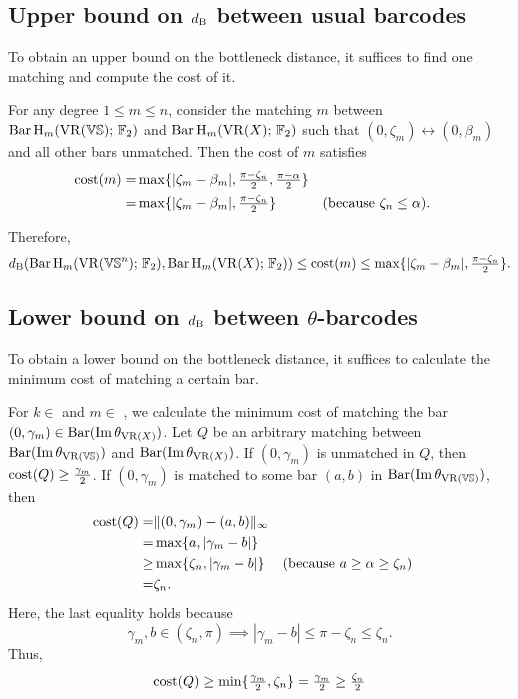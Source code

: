 \subsection{Upper bound on $d_{\mathrm{B}}$ between usual barcodes}

To obtain an upper bound on the bottleneck distance, it suffices to find one matching and compute the cost of it. 

For any degree $1\leq m\leq n$, consider the matching $m$ between $\operatorname{Bar} \operatorname{H}_{m}(\operatorname{VR}(\mathbb{V}\mathbb{S});\,{\mathbb{F}_2})$ and $\operatorname{Bar} \operatorname{H}_{m}(\operatorname{VR}(X);\,{\mathbb{F}_2})$ such that $(0,\zeta_m) \leftrightarrow (0, \beta_m)$ and all other bars unmatched. 
Then the cost of $m$ satisfies
\begin{align*}
    \mathrm{cost}(m) 
    = & \max\{|\zeta_m - \beta_m|, \tfrac{\pi - \zeta_n}{2}, \tfrac{\pi - \alpha}{2}\} \\
    = & \max\{|\zeta_m - \beta_m|, \tfrac{\pi - \zeta_n}{2}\} && \mbox{(because $\zeta_n \leq \alpha$)}.
\end{align*}

Therefore, 
\begin{equation}\label{eq:db_usual_upper_bound}
    d_{\mathrm{B}}(\operatorname{Bar} \operatorname{H}_{m}(\operatorname{VR}(\mathbb{V}\mathbb{S}^n);\,{\mathbb{F}_2}), \operatorname{Bar} \operatorname{H}_{m}(\operatorname{VR}(X);\,{\mathbb{F}_2}))
    \leq \mathrm{cost}(m) 
    \leq \max\{|\zeta_m - \beta_m|, \tfrac{\pi - \zeta_n}{2}\}.
\end{equation}


\subsection{Lower bound on $d_{\mathrm{B}}$ between $\theta$-barcodes}

To obtain a lower bound on the bottleneck distance, it suffices to calculate the minimum cost of matching a certain bar. 

For $k\in $ and $m\in $ , we calculate the minimum cost of matching the bar $(0,\gamma_m) \in \operatorname{Bar}(\operatorname{Im} \theta_{\operatorname{VR}(X)})$. 
Let $Q$ be an arbitrary matching between $\operatorname{Bar}(\operatorname{Im} \theta_{\operatorname{VR}(\mathbb{V}\mathbb{S})})$ and $\operatorname{Bar}(\operatorname{Im} \theta_{\operatorname{VR}(X)})$.
If $(0,\gamma_m)$ is unmatched in $Q$, then $\mathrm{cost}(Q) \geq \tfrac{\gamma_m}{2}$. 
If $(0,\gamma_m)$ is matched to some bar $(a,b)$ in $\operatorname{Bar}(\operatorname{Im} \theta_{\operatorname{VR}(\mathbb{V}\mathbb{S})})$, then 
\begin{align*}
    \mathrm{cost}(Q) 
    = & \|(0,\gamma_m) - (a,b)\|_\infty \\
    = & \max\{a, |\gamma_m - b|\} \\
    \geq & \max\{\zeta_n, |\gamma_m - b|\} && \mbox{(because $a\geq \alpha \geq \zeta_n$)}\\
    = & \zeta_n.
\end{align*}
Here, the last equality holds because 
\[
    \gamma_m, b \in (\zeta_n, \pi)
    \implies |\gamma_m - b| \leq \pi - \zeta_n \leq \zeta_n.
\]
Thus,
\[
    \mathrm{cost}(Q) 
    \geq \min\{\tfrac{\gamma_m}{2}, \zeta_n\} 
    = \tfrac{\gamma_m}{2} 
    \geq \tfrac{\zeta_n}{2} 
\]

